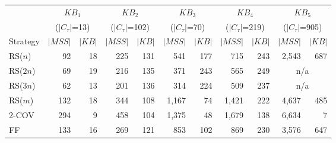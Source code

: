 \begin{tabular}{lrrrrrrrrrr}
\toprule
 & \multicolumn{2}{c}{$KB_1$} & \multicolumn{2}{c}{$KB_2$} & \multicolumn{2}{c}{$KB_3$} & \multicolumn{2}{c}{$KB_4$} & \multicolumn{2}{c}{$KB_5$} \\
 & \multicolumn{2}{c}{($|C_\tau|$=13)} & \multicolumn{2}{c}{($|C_\tau|$=102)} & \multicolumn{2}{c}{($|C_\tau|$=70)} & \multicolumn{2}{c}{($|C_\tau|$=219)} & \multicolumn{2}{c}{($|C_\tau|$=905)} \\
\cmidrule(lr){2-3} \cmidrule(lr){4-5} \cmidrule(lr){6-7} \cmidrule(lr){8-9} \cmidrule(lr){10-11}
Strategy & $|MSS|$ & $|KB|$ & $|MSS|$ & $|KB|$ & $|MSS|$ & $|KB|$ & $|MSS|$ & $|KB|$ & $|MSS|$ & $|KB|$ \\
\midrule
RS($n$) & 92 & 18 & 225 & 131 & 541 & 177 & 715 & 243 & 2{,}543 & 687 \\
RS($2n$) & 69 & 19 & 216 & 135 & 371 & 243 & 565 & 249 & \multicolumn{2}{c}{n/a} \\
RS($3n$) & 62 & 13 & 201 & 136 & 314 & 224 & 509 & 237 & \multicolumn{2}{c}{n/a} \\
RS($m$) & 132 & 18 & 344 & 108 & 1{,}167 & 74 & 1{,}421 & 222 & 4{,}637 & 485 \\
2-COV & 294 & 9 & 458 & 104 & 1{,}375 & 48 & 1{,}679 & 138 & 6{,}634 & 7 \\
FF & 133 & 16 & 269 & 121 & 853 & 102 & 869 & 230 & 3{,}576 & 647 \\
\bottomrule
\end{tabular}
